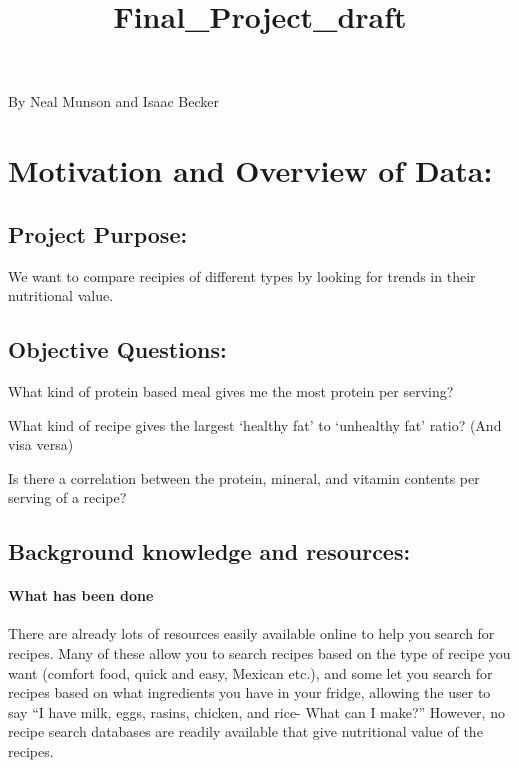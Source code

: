 \documentclass[11pt]{article}
\title{Final\_Project\_draft}
\begin{document}
    
    
    \maketitle
    
    

    
    By Neal Munson and Isaac Becker

    \hypertarget{motivation-and-overview-of-data}{%
\section{Motivation and Overview of
Data:}\label{motivation-and-overview-of-data}}

\hypertarget{project-purpose}{%
\subsection{Project Purpose:}\label{project-purpose}}

We want to compare recipies of different types by looking for trends in
their nutritional value.

\hypertarget{objective-questions}{%
\subsection{Objective Questions:}\label{objective-questions}}

What kind of protein based meal gives me the most protein per serving?

What kind of recipe gives the largest `healthy fat' to `unhealthy fat'
ratio? (And visa versa)

Is there a correlation between the protein, mineral, and vitamin
contents per serving of a recipe?

\hypertarget{background-knowledge-and-resources}{%
\subsection{Background knowledge and
resources:}\label{background-knowledge-and-resources}}

\hypertarget{what-has-been-done}{%
\paragraph{What has been done}\label{what-has-been-done}}

There are already lots of resources easily available online to help you
search for recipes. Many of these allow you to search recipes based on
the type of recipe you want (comfort food, quick and easy, Mexican
etc.), and some let you search for recipes based on what ingredients you
have in your fridge, allowing the user to say ``I have milk, eggs,
rasins, chicken, and rice- What can I make?'' However, no recipe search
databases are readily available that give nutritional value of the
recipes.
\end{document}
